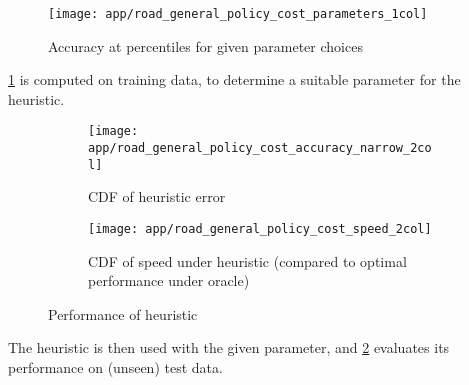 \begin{figure}
    \centering
    \texttt{[image: app/road\_general\_policy\_cost\_parameters\_1col]}
    \caption{Accuracy at percentiles for given parameter choices}
    \label{fig:app-policy-parameter-accuracy}
\end{figure}

\cref{fig:app-policy-parameter-accuracy} is computed on training data, to determine a suitable parameter for the heuristic.

\begin{figure}
    \begin{widepage}
    \begin{subfigure}[c]{0.5\textwidth}
      \texttt{[image: app/road\_general\_policy\_cost\_accuracy\_narrow\_2col]}
      \caption{CDF of heuristic error}
    \end{subfigure}
    \begin{subfigure}[c]{0.5\textwidth}
      \texttt{[image: app/road\_general\_policy\_cost\_speed\_2col]}
      \caption{CDF of speed under heuristic (compared to optimal performance under oracle)}
    \end{subfigure}
    \end{widepage}
    \caption{Performance of heuristic}
    \label{fig:app-cdf}
\end{figure}

The heuristic is then used with the given parameter, and \cref{fig:app-cdf} evaluates its performance on (unseen) test data.

%
%
%
%
%

